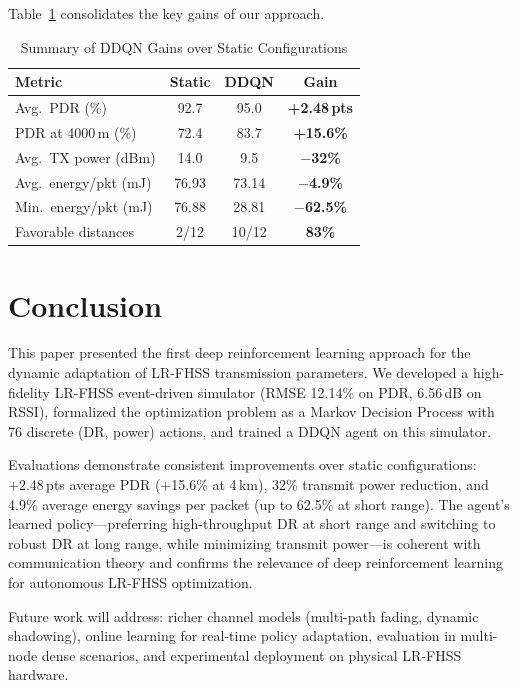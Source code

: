 \documentclass[conference]{IEEEtran}
\begin{document}
	Table~\ref{tab:summary} consolidates the key gains of our approach.
	
	\begin{table}[!t]
		\centering
		\caption{Summary of DDQN Gains over Static Configurations}
		\label{tab:summary}
		\begin{tabular}{|l|c|c|c|}
			\hline
			\textbf{Metric} & \textbf{Static} & \textbf{DDQN} & \textbf{Gain} \\
			\hline
			Avg.\ PDR (\%)           & 92.7  & 95.0  & \textbf{+2.48\,pts} \\
			PDR at 4000\,m (\%)      & 72.4  & 83.7  & \textbf{+15.6\%} \\
			Avg.\ TX power (dBm)     & 14.0  & 9.5   & \textbf{$-$32\%} \\
			Avg.\ energy/pkt (mJ)    & 76.93 & 73.14 & \textbf{$-$4.9\%} \\
			Min.\ energy/pkt (mJ)    & 76.88 & 28.81 & \textbf{$-$62.5\%} \\
			Favorable distances      & 2/12  & 10/12 & \textbf{83\%} \\
			\hline
		\end{tabular}
	\end{table}
	
	\section{Conclusion}
	\label{sec:conclusion}
	
	This paper presented the first deep reinforcement learning approach for the
	dynamic adaptation of LR-FHSS transmission parameters. We developed a
	high-fidelity LR-FHSS event-driven simulator (RMSE 12.14\% on PDR,
	6.56\,dB on RSSI), formalized the optimization problem as a Markov Decision
	Process with 76 discrete (DR, power) actions, and trained a DDQN agent on this
	simulator.
	
	Evaluations demonstrate consistent improvements over static configurations:
	+2.48\,pts average PDR (+15.6\% at 4\,km), 32\% transmit power reduction,
	and 4.9\% average energy savings per packet (up to 62.5\% at short range).
	The agent's learned policy---preferring high-throughput DR at short range and
	switching to robust DR at long range, while minimizing transmit power---is
	coherent with communication theory and confirms the relevance of deep
	reinforcement learning for autonomous LR-FHSS optimization.
	
	Future work will address: richer channel models (multi-path fading, dynamic
	shadowing), online learning for real-time policy adaptation, evaluation in
	multi-node dense scenarios, and experimental deployment on physical LR-FHSS
	hardware.
	
\end{document}
